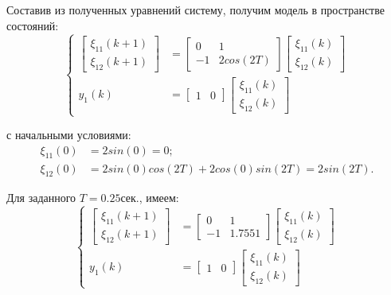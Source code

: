 \documentclass[a4paper,14pt]{extreport}
\begin{document}
Составив из полученных уравнений систему, получим модель в пространстве состояний:
\begin{equation}
\begin{cases}
\begin{bmatrix}
\xi_{11}(k+1) \\
\xi_{12}(k+1)
\end{bmatrix}
&=\begin{bmatrix}
0&1\\
-1& 2 cos(2 T)
\end{bmatrix}
\begin{bmatrix}
\xi_{11}(k)\\
\xi_{12}(k)
\end{bmatrix}
\\
y_1(k) &= \begin{bmatrix}
1& 0
\end{bmatrix}
\begin{bmatrix}
\xi_{11}(k)\\
\xi_{12}(k)
\end{bmatrix}
\end{cases}
\end{equation}

с начальными условиями:
\begin{align}
\xi_{11}(0) &= 2 sin(0) = 0;\\
\xi_{12}(0) &= 2 sin(0) cos(2T) + 2 cos(0) sin(2 T) = 2  sin(2 T).
\end{align}

Для заданного $T = 0.25 сек.$, имеем:
\begin{equation}
\begin{cases}
\begin{bmatrix}
\xi_{11}(k+1) \\
\xi_{12}(k+1)
\end{bmatrix}
&=\begin{bmatrix}
0&1\\
-1& 1.7551
\end{bmatrix}
\begin{bmatrix}
\xi_{11}(k)\\
\xi_{12}(k)
\end{bmatrix}
\\
y_1(k) &= \begin{bmatrix}
1& 0
\end{bmatrix}
\begin{bmatrix}
\xi_{11}(k)\\
\xi_{12}(k)
\end{bmatrix}
\end{cases}
\end{equation}
\end{document}

